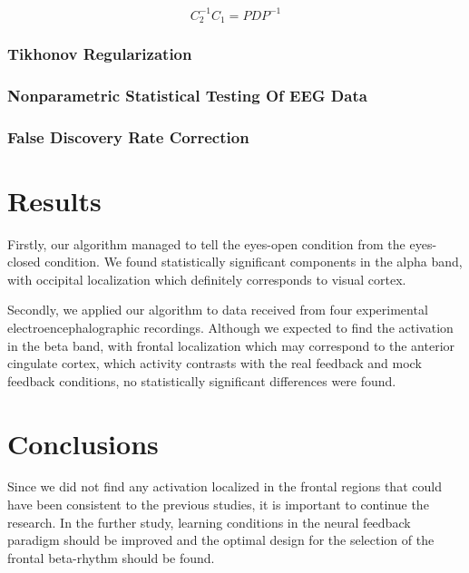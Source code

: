 \documentclass[14pt,a4paper]{scrartcl}
\begin{document}
\begin{equation}
C^{-1}_{2}C_{1} = PDP^{-1}
\end{equation}


\subsubsection{Tikhonov Regularization}
\label{sec:Methods:Data Analysis:Tikhonov Regularization}

\subsubsection{Nonparametric Statistical Testing Of EEG Data}
\label{sec:Methods:Data Analysis:Nonparametric Statistical Testing Of EEG Data}

\subsubsection{False Discovery Rate Correction}
\label{sec:Methods:Data Analysis:False Discovery Rate Correction}

\newpage
\section{Results}
\label{sec:Results}  

Firstly, our algorithm managed to tell the eyes-open condition from the eyes-closed condition. We found statistically significant components in the alpha band, with occipital localization which definitely corresponds to visual cortex.

Secondly, we applied our algorithm to data received from four experimental electroencephalographic recordings. Although we expected to find the activation in the beta band, with frontal localization which may correspond to the anterior cingulate cortex, which activity contrasts with the real feedback and mock feedback conditions, no statistically significant differences were found.

\newpage
\section{Conclusions}
\label{sec:Conclusions} 

Since we did not find any activation localized in the frontal regions that could have been consistent to the previous studies, it is important to continue the research. In the further study, learning conditions in the neural feedback paradigm should be improved and the optimal design for the selection of the frontal beta-rhythm should be found.
\end{document}
